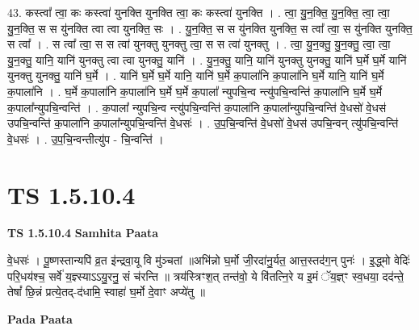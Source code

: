 \documentclass[17pt]{extarticle}
\begin{document}
43. कस्त्वा᳚ त्वा॒ कः कस्त्वा॑ युनक्ति युनक्ति त्वा॒ कः कस्त्वा॑ युनक्ति । . त्वा॒ यु॒न॒क्ति॒ यु॒न॒क्ति॒ त्वा॒ त्वा॒ यु॒न॒क्ति॒ स स यु॑नक्ति त्वा त्वा युनक्ति॒ सः । . यु॒न॒क्ति॒ स स यु॑नक्ति युनक्ति॒ स त्वा᳚ त्वा॒ स यु॑नक्ति युनक्ति॒ स त्वा᳚ । . स त्वा᳚ त्वा॒ स स त्वा॑ युनक्तु युनक्तु त्वा॒ स स त्वा॑ युनक्तु । . त्वा॒ यु॒न॒क्तु॒ यु॒न॒क्तु॒ त्वा॒ त्वा॒ यु॒न॒क्तु॒ यानि॒ यानि॑ युनक्तु त्वा त्वा युनक्तु॒ यानि॑ । . यु॒न॒क्तु॒ यानि॒ यानि॑ युनक्तु युनक्तु॒ यानि॑ घ॒र्मे घ॒र्मे यानि॑ युनक्तु युनक्तु॒ यानि॑ घ॒र्मे । . यानि॑ घ॒र्मे घ॒र्मे यानि॒ यानि॑ घ॒र्मे क॒पाला॑नि क॒पाला॑नि घ॒र्मे यानि॒ यानि॑ घ॒र्मे क॒पाला॑नि । . घ॒र्मे क॒पाला॑नि क॒पाला॑नि घ॒र्मे घ॒र्मे क॒पाला᳚ न्युपचि॒न्व न्त्यु॑पचि॒न्वन्ति॑ क॒पाला॑नि घ॒र्मे घ॒र्मे क॒पाला᳚न्युपचि॒न्वन्ति॑ । . क॒पाला᳚ न्युपचि॒न्व न्त्यु॑पचि॒न्वन्ति॑ क॒पाला॑नि क॒पाला᳚न्युपचि॒न्वन्ति॑ वे॒धसो॑ वे॒धस॑ उपचि॒न्वन्ति॑ क॒पाला॑नि क॒पाला᳚न्युपचि॒न्वन्ति॑ वे॒धसः॑ । . उ॒प॒चि॒न्वन्ति॑ वे॒धसो॑ वे॒धस॑ उपचि॒न्वन् त्यु॑पचि॒न्वन्ति॑ वे॒धसः॑ । . उ॒प॒चि॒न्वन्तीत्यु॑प - चि॒न्वन्ति॑ । \newline
\pagebreak
{}

\section{ TS 1.5.10.4 }

\textbf{TS 1.5.10.4 } \newline
\textbf{Samhita Paata} \newline

वे॒धसः॑ । पू॒ष्णस्तान्यपि॑ व्र॒त इ॑न्द्रवा॒यू वि मु॑ञ्चतां ॥अभि॑न्नो घ॒र्मो जी॒रदा॑नु॒र्यत॒ आत्त॒स्तद॑ग॒न् पुनः॑ । इ॒द्ध्मो वेदिः॑ परि॒धय॑श्च॒ सर्वे॑ य॒ज्ञ्स्याऽऽयु॒रनु॒ सं च॑रन्ति ॥ त्रय॑स्त्रिꣳश॒त् तन्त॑वो॒॒ ये वि॑तत्नि॒रे य इ॒मं ॅय॒ज्ञ्ꣳ स्व॒धया॒ दद॑न्ते॒ तेषां᳚ छि॒न्नं प्रत्ये॒तद्-द॑धामि॒ स्वाहा॑ घ॒र्मो दे॒वाꣳ अप्ये॑तु ॥ \newline

\textbf{Pada Paata} \newline
\end{document}
